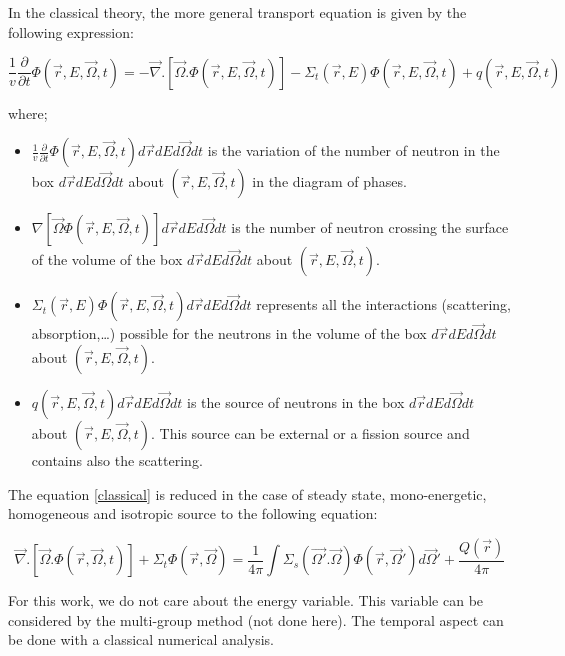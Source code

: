 \documentclass[a4paper, 12pt]{report}
\begin{document}
In the classical theory, the more general transport equation is given by the following expression:

\begin{equation}\label{classical}
\frac{1}{v}\frac{\partial}{\partial t} \Phi(\vec{r},E,\vec{\Omega},t) = -\vec{\nabla}. \left[\vec{\Omega}. \Phi(\vec{r},E,\vec{\Omega},t)\right] - \Sigma_t(\vec{r},E)\Phi(\vec{r},E,\vec{\Omega},t) + q(\vec{r},E,\vec{\Omega},t)
\end{equation}

where;
\begin{itemize}
\item $\frac{1}{v}\frac{\partial}{\partial t} \Phi(\vec{r},E,\vec{\Omega},t)d\vec{r}dEd\vec{\Omega}dt$ is the variation of the number of neutron in the box $d\vec{r}dEd\vec{\Omega}dt$ about $(\vec{r},E,\vec{\Omega},t)$ in the diagram of phases.
\item $\nabla \left[\vec{\Omega} \Phi(\vec{r},E,\vec{\Omega},t)\right]d\vec{r}dEd\vec{\Omega}dt$ is the number of neutron crossing the surface of the volume of the box $d\vec{r}dEd\vec{\Omega}dt$ about $(\vec{r},E,\vec{\Omega},t)$.
\item $\Sigma_t(\vec{r},E)\Phi(\vec{r},E,\vec{\Omega},t)d\vec{r}dEd\vec{\Omega}dt$ represents all the interactions (scattering, absorption,\dots) possible for the neutrons in the volume of the box $d\vec{r}dEd\vec{\Omega}dt$ about $(\vec{r},E,\vec{\Omega},t)$.
\item $q(\vec{r},E,\vec{\Omega},t)d\vec{r}dEd\vec{\Omega}dt$ is the source of neutrons in the box $d\vec{r}dEd\vec{\Omega}dt$ about $(\vec{r},E,\vec{\Omega},t)$. This source can be external or a fission source and contains also the scattering.
\end{itemize}

The equation \ref{classical} is reduced in the case of steady state, mono-energetic, homogeneous and isotropic source to the following equation:

\begin{equation}\label{steadyEnergy}
 \vec{\nabla}. \left[\vec{\Omega}. \Phi(\vec{r},\vec{\Omega},t)\right] + \Sigma_t \Phi(\vec{r},\vec{\Omega}) = \frac{1}{4\pi} \int \Sigma_s(\vec{\Omega'}.\vec{\Omega}) \Phi(\vec{r},\vec{\Omega}') d\vec{\Omega}' +\frac{Q(\vec{r})}{4\pi} 
\end{equation}

For this work, we do not care about the energy variable. This variable can be considered by the multi-group method (not done here). The temporal aspect can be done with a classical numerical analysis.
\end{document}
